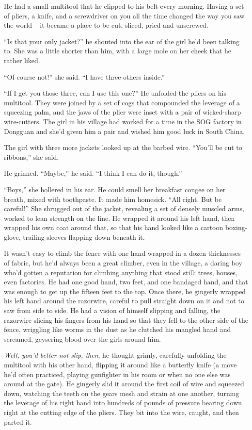 He had a small multitool that he clipped to his belt every morning.
Having a set of pliers, a knife, and a screwdriver on you all the
time changed the way you saw the world -- it became a place to be
cut, sliced, pried and unscrewed.

``Is that your only jacket?'' he shouted into the ear of the girl
he'd been talking to. She was a little shorter than him, with a
large mole on her cheek that he rather liked.

``Of course not!'' she said. ``I have three others inside.''

``If I get you those three, can I use this one?'' He unfolded the
pliers on his multitool. They were joined by a set of cogs that
compounded the leverage of a squeezing palm, and the jaws of the
plier were inset with a pair of wicked-sharp wire-cutters. The girl
in his village had worked for a time in the SOG factory in Dongguan
and she'd given him a pair and wished him good luck in South
China.

The girl with three more jackets looked up at the barbed wire.
``You'll be cut to ribbons,'' she said.

He grinned. ``Maybe,'' he said. ``I think I can do it, though.''

``Boys,'' she hollered in his ear. He could smell her breakfast
congee on her breath, mixed with toothpaste. It made him homesick.
``All right. But be careful!'' She shrugged out of the jacket,
revealing a set of densely muscled arms, worked to lean strength on
the line. He wrapped it around his left hand, then wrapped his own
coat around that, so that his hand looked like a cartoon
boxing-glove, trailing sleeves flapping down beneath it.

It wasn't easy to climb the fence with one hand wrapped in a dozen
thicknesses of fabric, but he'd always been a great climber, even
in the village, a daring boy who'd gotten a reputation for climbing
anything that stood still: trees, houses, even factories. He had
one good hand, two feet, and one bandaged hand, and that was enough
to get up the fifteen feet to the top. Once there, he gingerly
wrapped his left hand around the razorwire, careful to pull
straight down on it and not to saw from side to side. He had a
vision of himself slipping and falling, the razorwire slicing his
fingers from his hand so that they fell to the other side of the
fence, wriggling like worms in the dust as he clutched his mangled
hand and screamed, geysering blood over the girls around him.

\emph{Well, you'd better not slip, then}, he thought grimly,
carefully unfolding the multitool with his other hand, flipping it
around like a butterfly knife (a move he'd often practiced, playing
gunfighter in his room or when no one else was around at the gate).
He gingerly slid it around the first coil of wire and squeezed
down, watching the teeth on the gears mesh and strain at one
another, turning the leverage of his right hand into hundreds of
pounds of pressure bearing down right at the cutting edge of the
pliers. They bit into the wire, caught, and then parted it.

